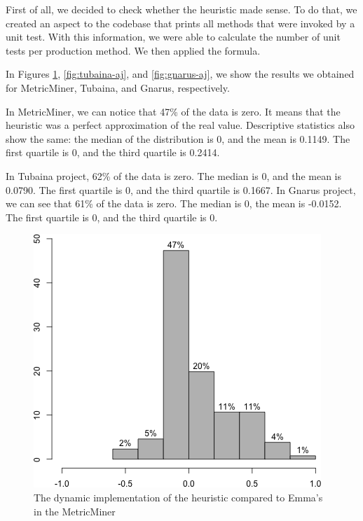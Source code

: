 \documentclass{sig-alternate}
\begin{document}
First of all, we decided to check whether the heuristic made sense. To do that, we 
created an aspect to the codebase that prints all methods that were invoked by a unit test. 
With this information, we were able to calculate the number of unit tests per production method. 
We then applied the formula. 

In Figures \ref{fig:metricminer-aj}, \ref{fig:tubaina-aj}, and
\ref{fig:gnarus-aj}, we show the results we obtained for MetricMiner, Tubaina, and Gnarus, respectively. 

In MetricMiner, we can notice that 47\% of the data is zero. It means that the heuristic
was a perfect approximation of the real value. Descriptive statistics also show the same: 
the median of the distribution is 0, and the mean is 0.1149. The first quartile is 0, and the
third quartile is 0.2414.

In Tubaina project, 62\% of the data is zero. The median is 0, and the mean is 0.0790. The first quartile is
0, and the third quartile is 0.1667. 
In Gnarus project, we can see that 61\% of the data is zero. The median is 0, the mean is -0.0152. The first quartile
is 0, and the third quartile is 0.

\begin{figure}[h!H]
  \centering
  \includegraphics[scale=0.35]{../stats/metricminer-histograma-aspectj.png}
  \caption{The dynamic implementation of the heuristic compared to Emma's in the MetricMiner}
  \label{fig:metricminer-aj}
\end{figure}
\end{document}
